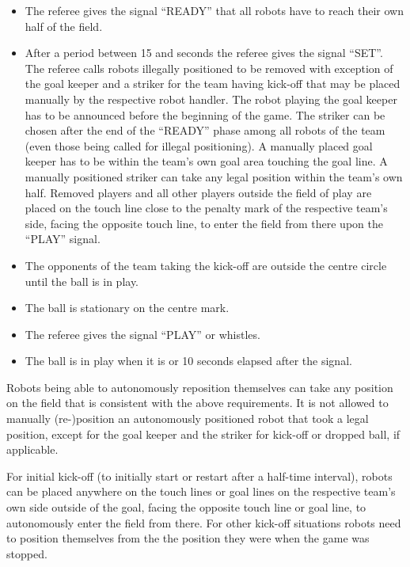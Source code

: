 \begin{itemize}
\item The referee gives the signal ``READY'' that all robots have to reach their own half of the field. 
\item After a period between 15 and   seconds the referee gives the signal ``SET''. The referee calls robots illegally positioned to be removed with exception of the goal keeper and a striker for the team having kick-off that may be placed manually by the respective robot handler. The robot playing the goal keeper has to be announced before the beginning of the game. The striker can be chosen after the end of the ``READY'' phase among all robots of the team (even those being called for illegal positioning). A manually placed goal keeper has to be within the team's own goal area touching the goal line. A manually positioned striker can take any legal position within the team's own half. Removed players and all other players outside the field of play are placed on the touch line close to the penalty mark of the respective team's side, facing the opposite touch line, to enter the field from there upon the ``PLAY'' signal. 
\item The opponents of the team taking the kick-off are outside the centre circle until the ball is in play.
\item The ball is stationary on the centre mark. 
\item The referee gives the signal ``PLAY'' or whistles.
\item The ball is in play when it is   or 10 seconds elapsed after the signal.
\end{itemize}

Robots being able to autonomously reposition themselves can take any position on the field that is consistent with the above requirements. It is not allowed to manually (re-)position an autonomously positioned robot that took a legal position, except for the goal keeper and the striker for kick-off or dropped ball, if applicable.
 
For initial kick-off (to initially start or restart after a half-time interval), robots can be placed anywhere on the touch lines or goal lines on the respective team's own side outside of the goal, facing the opposite touch line or goal line, to autonomously enter the field from there. For other kick-off situations robots need to position themselves from the the position they were when the game was stopped.

